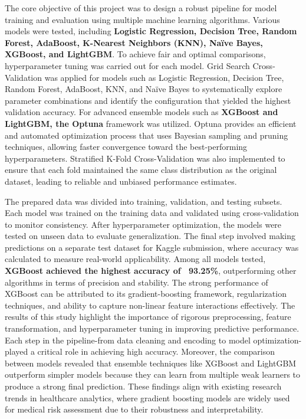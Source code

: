 The core objective of this project was to design a robust pipeline for model training and evaluation using multiple machine learning algorithms.
Various models were tested, including \textbf{Logistic Regression, Decision Tree, Random Forest, AdaBoost, K-Nearest Neighbors (KNN), Naïve Bayes, XGBoost, and LightGBM}. To achieve fair and optimal comparisons, hyperparameter tuning was carried out for each model.
Grid Search Cross-Validation was applied for models such as Logistic Regression, Decision Tree, Random Forest, AdaBoost, KNN, and Naïve Bayes to systematically explore parameter combinations and identify the configuration that yielded the highest validation accuracy.
For advanced ensemble models such as \textbf{XGBoost and LightGBM, the Optuna} framework was utilized.
Optuna provides an efficient and automated optimization process that uses Bayesian sampling and pruning techniques, allowing faster convergence toward the best-performing hyperparameters.
Stratified K-Fold Cross-Validation was also implemented to ensure that each fold maintained the same class distribution as the original dataset, leading to reliable and unbiased performance estimates.

The prepared data was divided into training, validation, and testing subsets.
Each model was trained on the training data and validated using cross-validation to monitor consistency.
After hyperparameter optimization, the models were tested on unseen data to evaluate generalization.
The final step involved making predictions on a separate test dataset for Kaggle submission, where accuracy was calculated to measure real-world applicability.
Among all models tested, \textbf{XGBoost achieved the highest accuracy of ~93.25\%}, outperforming other algorithms in terms of precision and stability.
The strong performance of XGBoost can be attributed to its gradient-boosting framework, regularization techniques, and ability to capture non-linear feature interactions effectively.
The results of this study highlight the importance of rigorous preprocessing, feature transformation, and hyperparameter tuning in improving predictive performance.
Each step in the pipeline-from data cleaning and encoding to model optimization- played a critical role in achieving high accuracy.
Moreover, the comparison between models revealed that ensemble techniques like XGBoost and LightGBM outperform simpler models because they can learn from multiple weak learners to produce a strong final prediction.
These findings align with existing research trends in healthcare analytics, where gradient boosting models are widely used for medical risk assessment due to their robustness and interpretability.

